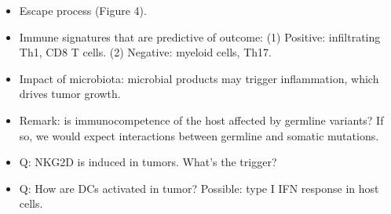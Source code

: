 \documentclass{report}
\begin{document}
\begin{itemize}
	\item Escape process (Figure 4). 
	
	\item Immune signatures that are predictive of outcome: (1) Positive: infiltrating Th1, CD8 T cells.  (2) Negative: myeloid cells, Th17. 
	
	\item Impact of microbiota: microbial products may trigger inflammation, which drives tumor growth. 
	
	\item Remark: is immunocompetence of the host affected by germline variants? If so, we would expect interactions between germline and somatic mutations. 
	
	\item Q: NKG2D is induced in tumors. What’s the trigger? 
	
	\item Q: How are DCs activated in tumor? Possible: type I IFN response in host cells. 
\end{itemize}
\end{document}
